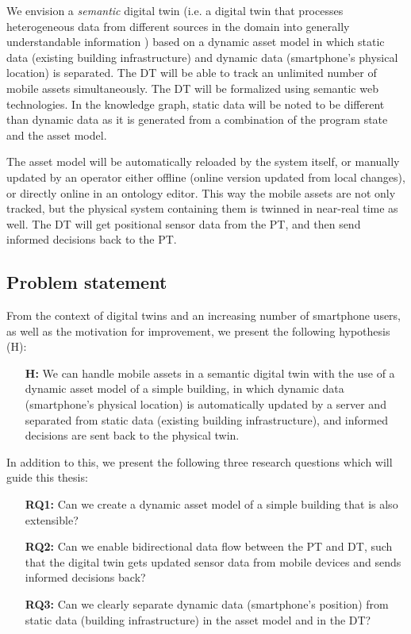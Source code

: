 \documentclass{article}
\begin{document}
We envision a \emph{semantic} digital twin (i.e. a digital twin that processes heterogeneous data from different sources in the domain into generally understandable information \cite{birgit_boss_digital_nodate}) based on a dynamic asset model in which static data (existing building infrastructure) and dynamic data (smartphone's physical location) is separated. The DT will be able to track an unlimited number of mobile assets simultaneously. The DT will be formalized using semantic web technologies. In the knowledge graph, static data will be noted to be different than dynamic data as it is generated from a combination of the program state and the asset model. 

The asset model will be automatically reloaded by the system itself, or manually updated by an operator either offline (online version updated from local changes), or directly online in an ontology editor. This way the mobile assets are not only tracked, but the physical system containing them is twinned in near-real time as well. The DT will get positional sensor data from the PT, and then send informed decisions back to the PT.

\subsection{Problem statement}
From the context of digital twins and an increasing number of smartphone users, as well as the motivation for improvement, we present the following hypothesis (H):

\begin{itemize}
    \item[\textbf{H:}] We can handle mobile assets in a semantic digital twin with the use of a dynamic asset model of a simple building, in which dynamic data (smartphone's physical location) is automatically updated by a server and separated from static data (existing building infrastructure), and informed decisions are sent back to the physical twin.
\end{itemize}


In addition to this, we present the following three research questions which will guide this thesis:
\begin{itemize}
    \item[\textbf{RQ1:}]
    Can we create a dynamic asset model of a simple building that is also extensible?
    \item [\textbf{RQ2:}] 
    Can we enable bidirectional data flow between the PT and DT, such that the digital twin gets updated sensor data from mobile devices and sends informed decisions back?
    \item [\textbf{RQ3:}]
    Can we clearly separate dynamic data (smartphone's position) from static data (building infrastructure) in the asset model and in the DT?
\end{itemize}
\end{document}
